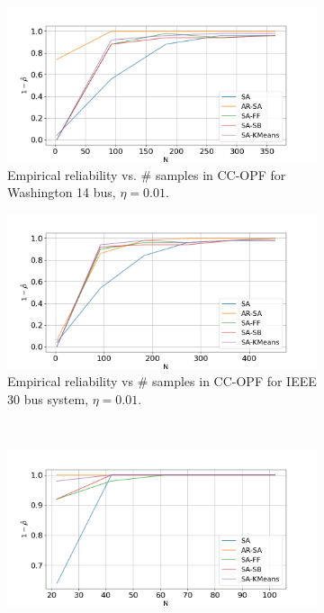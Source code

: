 \begin{figure}[hbt]
\begin{subfigure}{.50\textwidth}
  \centering
  \hspace{-0mm}\includegraphics[width=0.95\linewidth]{Dissertation/images/dynamic/washington14/1_beta_N_363_eta_0.01.png}
  \caption{Empirical reliability %
  vs. $\#$ samples in CC-OPF for Washington 14 bus, $\eta = 0.01$.}
  \label{fig:washington14conservatism}
\end{subfigure}
\begin{subfigure}{.50\textwidth}
  \centering
  \hspace{-0mm}\includegraphics[width=0.95\linewidth]{Dissertation/images/dynamic/ieee30/1_beta_N_453_eta_0.01.png}
  \caption{Empirical reliability %
  vs $\#$ samples  in CC-OPF for IEEE 30 bus system, $\eta = 0.01$.}
  \label{fig:ieee30conservatism}
\end{subfigure}\\
\begin{subfigure}{.50\textwidth}
  \centering
  \hspace{0mm}\includegraphics[width=0.95\linewidth]{Dissertation/images/dynamic/grid6/1_beta_N_102_eta_0.1.png}

\end{subfigure}
\end{figure}
